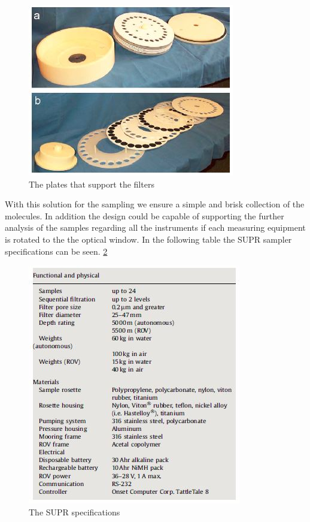 \begin{figure}[htb]
  \centering
  \includegraphics[scale=0.65]{figures/BFfig/Filters}
  \caption{The plates that support the filters}
  \label{fig:Filters}
\end{figure}

With this solution for the sampling we ensure a simple and brisk collection of the molecules. In addition the design could be capable of supporting the further analysis of the samples regarding all the instruments if each measuring equipment is rotated to the the optical window.
In the following table the SUPR sampler specifications can be seen.
\ref{fig:SUPR_spec}

\begin{figure}[htb]
  \centering
  \includegraphics[scale=0.8]{figures/BFfig/SUPR_spec}
  \caption{The SUPR specifications}
  \label{fig:SUPR_spec}
\end{figure}
